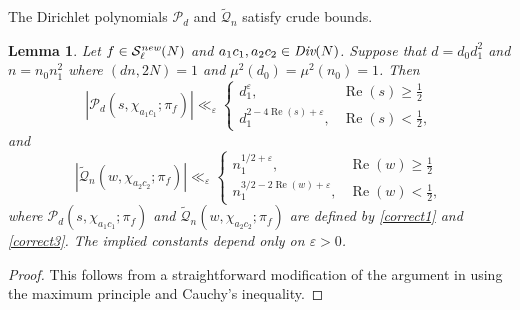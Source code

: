 \documentclass[12pt,reqno]{amsart}
\theoremstyle{plain}
\newtheorem{lemma}{Lemma}
\theoremstyle{remark}
\renewcommand{\Re}{\operatorname{Re}}
\numberwithin{equation}{section}
\numberwithin{lemma}{section}
\numberwithin{theorem}{section}
\numberwithin{prop}{section}
\numberwithin{remark}{section}
\begin{document}
The Dirichlet polynomials $\mathcal{P}_d$ and 
 $\widetilde{\mathcal{Q}}_{n}$ satisfy crude bounds.
\begin{lemma} \label{corrbound}
Let $f \in \mathcal{S}^{\emph{new}}_{\ell}(N)$ and $a_1 c_1, a_2 c_2 \in \emph{Div}(N)$. 
Suppose that $d=d_0 d_1^2$ and $n=n_0 n_1^2$ where $(dn,2N)=1$ and $\mu^2(d_0)=\mu^2(n_0)=1$.
Then 
\begin{equation} \label{Pbound}
| \mathcal{P}_d(s,\chi_{a_1 c_1};\pi_f)| \ll_{\varepsilon}
\begin{cases}
d_1^{\varepsilon}, & \Re(s) \geq \frac{1}{2} \\
d_1^{2-4 \Re(s)+\varepsilon}, & \Re(s) < \frac{1}{2},
\end{cases}
\end{equation}
and 
\begin{equation} \label{Qbound} 
|\widetilde{\mathcal{Q}}_{n}(w,\chi_{a_2 c_2};\pi_f)| \ll_{\varepsilon}
\begin{cases}
n_1^{1/2+\varepsilon}, & \Re(w) \geq \frac{1}{2} \\
n_1^{3/2-2 \Re(w)+\varepsilon}, & \Re(w) < \frac{1}{2},
\end{cases}
\end{equation}
where $\mathcal{P}_d(s,\chi_{a_1 c_1};\pi_f)$ and $\widetilde{\mathcal{Q}}_{n}(w,\chi_{a_2 c_2};\pi_f)$
are defined by \eqref{correct1} and \eqref{correct3}.
The implied constants depend only on $\varepsilon>0$.
\end{lemma}
\begin{proof}
This follows from a straightforward modification of the argument in \cite[Appendix~B]{Di}
using the maximum principle and Cauchy's inequality.
\end{proof}
\end{document}
